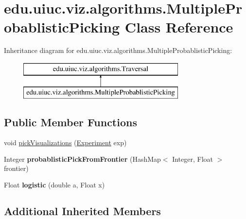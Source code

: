 \hypertarget{classedu_1_1uiuc_1_1viz_1_1algorithms_1_1_multiple_probablistic_picking}{}\section{edu.\+uiuc.\+viz.\+algorithms.\+Multiple\+Probablistic\+Picking Class Reference}
\label{classedu_1_1uiuc_1_1viz_1_1algorithms_1_1_multiple_probablistic_picking}
Inheritance diagram for edu.\+uiuc.\+viz.\+algorithms.\+Multiple\+Probablistic\+Picking\+:\begin{figure}[H]
\begin{center}
\leavevmode
\includegraphics[height=2.000000cm]{classedu_1_1uiuc_1_1viz_1_1algorithms_1_1_multiple_probablistic_picking}
\end{center}
\end{figure}
\subsection*{Public Member Functions}
\begin{DoxyCompactItemize}
\item 
void \mbox{\hyperlink{classedu_1_1uiuc_1_1viz_1_1algorithms_1_1_multiple_probablistic_picking_a2242e3dcbae46fe66872bbe6fe912049}{pick\+Visualizations}} (\mbox{\hyperlink{classedu_1_1uiuc_1_1viz_1_1algorithms_1_1_experiment}{Experiment}} exp)
\item 
\mbox{\label{classedu_1_1uiuc_1_1viz_1_1algorithms_1_1_multiple_probablistic_picking_a71f925699072e629849b0dee47ebfcb3}} 
Integer {\bfseries probablistic\+Pick\+From\+Frontier} (Hash\+Map$<$ Integer, Float $>$ frontier)
\item 
\mbox{\label{classedu_1_1uiuc_1_1viz_1_1algorithms_1_1_multiple_probablistic_picking_a47a82a00700c994be6300cc86df206d7}} 
Float {\bfseries logistic} (double a, Float x)
\end{DoxyCompactItemize}
\subsection*{Additional Inherited Members}


